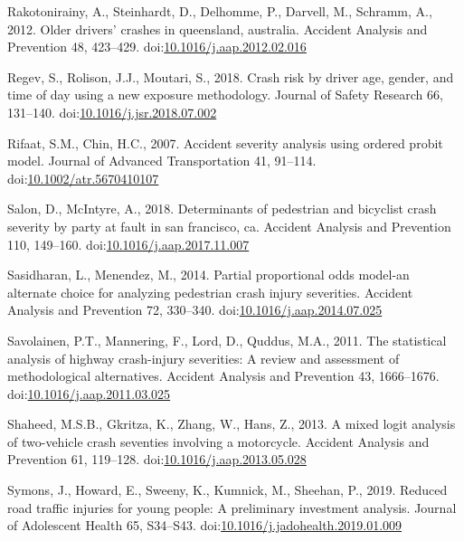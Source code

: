 \documentclass[]{elsarticle} %
\begin{document}
\leavevmode\hypertarget{ref-Rakotonirainy2012older}{}%
Rakotonirainy, A., Steinhardt, D., Delhomme, P., Darvell, M., Schramm,
A., 2012. Older drivers' crashes in queensland, australia. Accident
Analysis and Prevention 48, 423--429.
doi:\href{https://doi.org/10.1016/j.aap.2012.02.016}{10.1016/j.aap.2012.02.016}

\leavevmode\hypertarget{ref-Regev2018crash}{}%
Regev, S., Rolison, J.J., Moutari, S., 2018. Crash risk by driver age,
gender, and time of day using a new exposure methodology. Journal of
Safety Research 66, 131--140.
doi:\href{https://doi.org/10.1016/j.jsr.2018.07.002}{10.1016/j.jsr.2018.07.002}

\leavevmode\hypertarget{ref-Rifaat2007accident}{}%
Rifaat, S.M., Chin, H.C., 2007. Accident severity analysis using ordered
probit model. Journal of Advanced Transportation 41, 91--114.
doi:\href{https://doi.org/10.1002/atr.5670410107}{10.1002/atr.5670410107}

\leavevmode\hypertarget{ref-Salon2018determinants}{}%
Salon, D., McIntyre, A., 2018. Determinants of pedestrian and bicyclist
crash severity by party at fault in san francisco, ca. Accident Analysis
and Prevention 110, 149--160.
doi:\href{https://doi.org/10.1016/j.aap.2017.11.007}{10.1016/j.aap.2017.11.007}

\leavevmode\hypertarget{ref-Sasidharan2014partial}{}%
Sasidharan, L., Menendez, M., 2014. Partial proportional odds model-an
alternate choice for analyzing pedestrian crash injury severities.
Accident Analysis and Prevention 72, 330--340.
doi:\href{https://doi.org/10.1016/j.aap.2014.07.025}{10.1016/j.aap.2014.07.025}

\leavevmode\hypertarget{ref-Savolainen2011statistical}{}%
Savolainen, P.T., Mannering, F., Lord, D., Quddus, M.A., 2011. The
statistical analysis of highway crash-injury severities: A review and
assessment of methodological alternatives. Accident Analysis and
Prevention 43, 1666--1676.
doi:\href{https://doi.org/10.1016/j.aap.2011.03.025}{10.1016/j.aap.2011.03.025}

\leavevmode\hypertarget{ref-Shaheed2013mixed}{}%
Shaheed, M.S.B., Gkritza, K., Zhang, W., Hans, Z., 2013. A mixed logit
analysis of two-vehicle crash seventies involving a motorcycle. Accident
Analysis and Prevention 61, 119--128.
doi:\href{https://doi.org/10.1016/j.aap.2013.05.028}{10.1016/j.aap.2013.05.028}

\leavevmode\hypertarget{ref-Symons2019reduced}{}%
Symons, J., Howard, E., Sweeny, K., Kumnick, M., Sheehan, P., 2019.
Reduced road traffic injuries for young people: A preliminary investment
analysis. Journal of Adolescent Health 65, S34--S43.
doi:\href{https://doi.org/10.1016/j.jadohealth.2019.01.009}{10.1016/j.jadohealth.2019.01.009}
\end{document}
